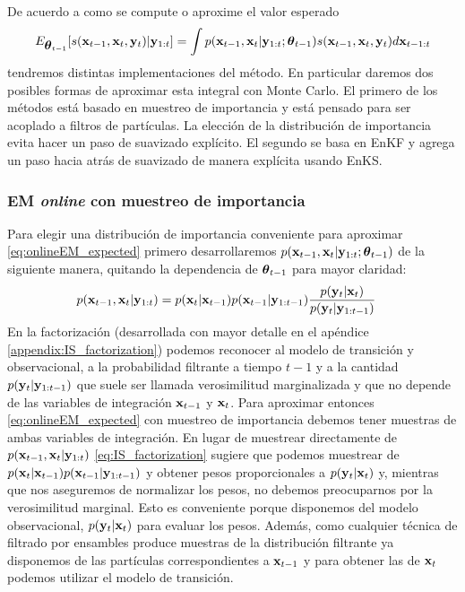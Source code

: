 De acuerdo a como se compute o aproxime el valor esperado
\begin{align}
    E_{\mbox{\boldmath$ \theta $}_{t-1}} [s(\mathbf{x}_{t-1}, \mathbf{x}_t, \mathbf{y}_t) | \mathbf{y}_{1:t}] = \int p(\mathbf{x}_{t-1}, \mathbf{x}_t| \mathbf{y}_{1:t} ; \mbox{\boldmath$ \theta $}_{t-1}) s(\mathbf{x}_{t-1}, \mathbf{x}_t, \mathbf{y}_t) d\mathbf{x}_{t-1:t} \label{eq:onlineEM_expected}
\end{align}
tendremos distintas implementaciones del método. En particular daremos dos posibles formas de aproximar esta integral con Monte Carlo. El primero de los métodos está basado en muestreo de importancia y está pensado para ser acoplado a filtros de partículas. La elección de la distribución de importancia evita hacer un paso de suavizado explícito. El segundo se basa en EnKF y agrega un paso hacia atrás de suavizado de manera explícita usando EnKS. 

\subsubsection*{EM \textit{online} con muestreo de importancia} \label{sec:onlineEM_IS}

Para elegir una distribución de importancia conveniente para aproximar \ref{eq:onlineEM_expected} primero desarrollaremos $p(\mathbf{x}_{t-1}, \mathbf{x}_t| \mathbf{y}_{1:t}; \mbox{\boldmath$ \theta $}_{t-1})$ de la siguiente manera, quitando la dependencia de $\mbox{\boldmath$ \theta $}_{t-1}$ para mayor claridad:
\begin{align}
    p(\mathbf{x}_{t-1}, \mathbf{x}_t| \mathbf{y}_{1:t}) &= p(\mathbf{x}_t | \mathbf{x}_{t-1}) p(\mathbf{x}_{t-1} | \mathbf{y}_{1:t-1}) \frac{p(\mathbf{y}_t | \mathbf{x}_t)}{p(\mathbf{y}_t | \mathbf{y}_{1:t-1})} \label{eq:IS_factorization}
\end{align}
En la factorización (desarrollada con mayor detalle en el apéndice \ref{appendix:IS_factorization}) podemos reconocer al modelo de transición y observacional, a la probabilidad filtrante a tiempo $t-1$ y a la cantidad $p(\mathbf{y}_t | \mathbf{y}_{1:t-1})$ que suele ser llamada verosimilitud marginalizada y que no depende de las variables de integración $\mathbf{x}_{t-1}$ y $\mathbf{x}_t$. Para aproximar entonces \ref{eq:onlineEM_expected} con muestreo de importancia debemos tener muestras de ambas variables de integración. En lugar de muestrear directamente de $p(\mathbf{x}_{t-1}, \mathbf{x}_t| \mathbf{y}_{1:t})$ \ref{eq:IS_factorization} sugiere que podemos muestrear de $p(\mathbf{x}_t | \mathbf{x}_{t-1}) p(\mathbf{x}_{t-1} | \mathbf{y}_{1:t-1})$ y obtener pesos proporcionales a $p(\mathbf{y}_t | \mathbf{x}_t)$ y, mientras que nos aseguremos de normalizar los pesos, no debemos preocuparnos por la verosimilitud marginal. Esto es conveniente porque disponemos del modelo observacional, $p(\mathbf{y}_t | \mathbf{x}_t)$ para evaluar los pesos. Además, como cualquier técnica de filtrado por ensambles produce muestras de la distribución filtrante ya disponemos de las partículas correspondientes a $\mathbf{x}_{t-1}$ y para obtener las de $\mathbf{x}_t$ podemos utilizar el modelo de transición.

